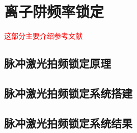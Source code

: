 
\chapter[离子阱频率锁定]{离子阱频率锁定}

\textcolor{red}{这部分主要介绍参考文献\cite[]{Johnson_Wong_Campos_Restelli_Landsman_Neyenhuis_Mizrahi_Monroe_2016}}
\section[离子阱频率锁定原理]{脉冲激光拍频锁定原理}

\section[离子阱频率锁定系统搭建]{脉冲激光拍频锁定系统搭建}

\section[离子阱频率锁定系统结果]{脉冲激光拍频锁定系统结果}